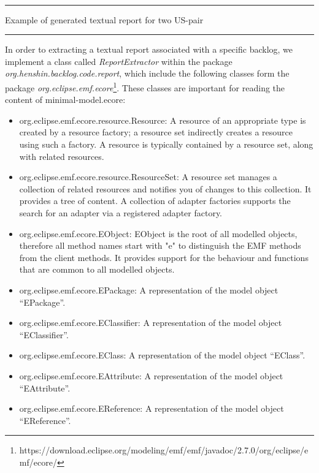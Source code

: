\begin{MyListing}
\paragraph{}
\hrule
\centering

\caption{Example of generated textual report for two US-pair}\label{list:textual_report_sample}
\hrule
\end{MyListing}
In order to extracting a textual report associated with a specific backlog, we implement a class called \textit{ReportExtractor} within the package \textit{org.henshin.backlog.code.report}, which include the following classes form the package \textit{org.eclipse.emf.ecore}\footnote{https://download.eclipse.org/modeling/emf/emf/javadoc/2.7.0/org/eclipse/emf/ecore/}. These classes are important for reading the content of minimal-model.ecore:
\begin{itemize}
	\item org.eclipse.emf.ecore.resource.Resource: A resource of an appropriate type is created by a resource factory; a resource set indirectly creates a resource using such a factory. A resource is typically contained by a resource set, along with related resources.
	\item org.eclipse.emf.ecore.resource.ResourceSet: A resource set manages a collection of related resources and notifies you of changes to this collection. It provides a tree of content. A collection of adapter factories supports the search for an adapter via a registered adapter factory. 
	\item org.eclipse.emf.ecore.EObject: EObject is the root of all modelled objects, therefore all method names start with "e" to distinguish the EMF methods from the client methods. It provides support for the behaviour and functions that are common to all modelled objects.
	\item org.eclipse.emf.ecore.EPackage: A representation of the model object \enquote{EPackage}.
	\item org.eclipse.emf.ecore.EClassifier: A representation of the model object \enquote{EClassifier}.
	\item org.eclipse.emf.ecore.EClass: A representation of the model object \enquote{EClass}.
	\item org.eclipse.emf.ecore.EAttribute: A representation of the model object \enquote{EAttribute}.
	\item org.eclipse.emf.ecore.EReference:  A representation of the model object \enquote{EReference}.
\end{itemize}

